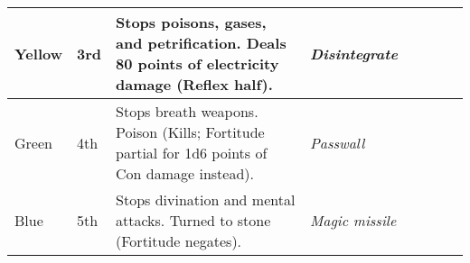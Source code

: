 \begin{longtable}{llllllll}
\hline
\multicolumn{1}{p{0.042in}|}{\begin{minipage}[t]{0.042in}\raggedright
Yellow\end{minipage}} & \multicolumn{1}{p{0.042in}|}{\begin{minipage}[t]{0.042in}\raggedright
3rd\end{minipage}} & \multicolumn{1}{p{0.042in}|}{\begin{minipage}[t]{0.042in}\raggedright
Stops poisons, gases, and petrification.\linebreak
Deals 80 points of electricity damage (Reflex half).\end{minipage}} & \multicolumn{1}{p{0.042in}|}{\begin{minipage}[t]{0.042in}\raggedright
\textit{Disintegrate}\end{minipage}}\\
\hline
\multicolumn{1}{|p{0.515in}|}{\begin{minipage}[t]{0.515in}\raggedright
Green\end{minipage}} & \multicolumn{1}{p{0.480in}|}{\begin{minipage}[t]{0.480in}\raggedright
4th\end{minipage}} & \multicolumn{1}{p{2.513in}|}{\begin{minipage}[t]{2.513in}\raggedright
Stops breath weapons.\linebreak
Poison (Kills; Fortitude partial for 1d6 points of Con damage instead).\end{minipage}} & \multicolumn{5}{p{0.991in}|}{\begin{minipage}[t]{0.991in}\raggedright
\textit{Passwall}\end{minipage}}\\
\hline
\multicolumn{1}{p{0.042in}|}{\begin{minipage}[t]{0.042in}\raggedright
Blue\end{minipage}} & \multicolumn{1}{p{0.042in}|}{\begin{minipage}[t]{0.042in}\raggedright
5th\end{minipage}} & \multicolumn{1}{p{0.042in}|}{\begin{minipage}[t]{0.042in}\raggedright
Stops divination and mental attacks.\linebreak
Turned to stone (Fortitude negates).\end{minipage}} & \multicolumn{1}{p{0.042in}|}{\begin{minipage}[t]{0.042in}\raggedright
\textit{Magic missile}\end{minipage}}\\

\end{longtable}
